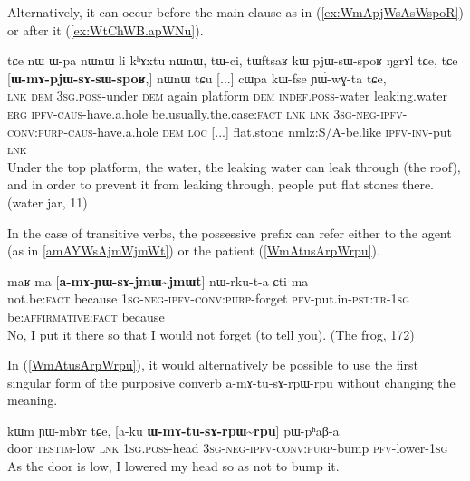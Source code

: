 \documentclass[oldfontcommands,oneside,a4paper,11pt]{article}
\newcommand{\ipa}[1]{{\phon \mbox{#1}}} %
\newcommand{\refb}[1]{(\ref{#1})}
\begin{document}
Alternatively, it can occur   before the main clause as in \refb{ex:WmApjWsAsWspoR} or after it \refb{ex:WtChWB.apWNu}.

\begin{exe}
\ex \label{ex:WmApjWsAsWspoR}
\gll
\ipa{tɕe}   	\ipa{nɯ}   	\ipa{ɯ-pa}   	\ipa{nɯnɯ}   	\ipa{li}   	\ipa{kʰɤxtu}   	\ipa{nɯnɯ,}   	\ipa{tɯ-ci,}   	\ipa{tɯftsaʁ}   	\ipa{kɯ}   	\ipa{pjɯ-sɯ-spoʁ}   	\ipa{ŋgrɤl}   	\ipa{tɕe,}    \ipa{tɕe}   	[\ipa{\textbf{ɯ-mɤ-pjɯ-sɤ-sɯ-spoʁ},}]   	\ipa{nɯnɯ}   	\ipa{tɕu}   [...] \ipa{cɯpa}   	\ipa{kɯ-fse}   	\ipa{ɲɯ́-wɣ-ta}   	\ipa{tɕe,}   \\
\textsc{lnk} \textsc{dem} \textsc{3sg.poss}-under \textsc{dem} again platform \textsc{dem} \textsc{indef.poss}-water leaking.water \textsc{erg} \textsc{ipfv}-\textsc{caus}-have.a.hole be.usually.the.case:\textsc{fact} \textsc{lnk} \textsc{lnk} \textsc{3sg-neg-ipfv-conv:purp}-\textsc{caus}-have.a.hole \textsc{dem} \textsc{loc} [...] flat.stone nm\textsc{}lz:S/A-be.like \textsc{ipfv-inv}-put \textsc{lnk} \\
\glt Under the top platform, the water, the leaking water can leak through (the roof), and in order to prevent it from leaking through, people put flat stones there. (water jar, 11)
\end{exe}

In the case of transitive verbs, the possessive prefix can refer either to the agent (as in \ref{amAYWsAjmWjmWt}) or the patient \refb{WmAtusArpWrpu}.

\begin{exe}
\ex \label{amAYWsAjmWjmWt}
\gll 
\ipa{maʁ}   	\ipa{ma}   	[\ipa{\textbf{a-mɤ-ɲɯ-sɤ-jmɯ\textasciitilde{}jmɯt}}]   	\ipa{nɯ-rku-t-a}   	\ipa{ɕti}   	\ipa{ma}   \\
not.be:\textsc{fact} because \textsc{1sg-neg-ipfv-conv:purp}-forget \textsc{pfv}-put.in-\textsc{pst:tr-1sg} be:\textsc{affirmative}:\textsc{fact} because \\
\glt No, I put it there so that I would not forget (to tell you). (The frog, 172)
\end{exe}

In \refb{WmAtusArpWrpu}, it would alternatively be possible to use the first singular form of the purposive converb \ipa{a-mɤ-tu-sɤ-rpɯ-rpu}   without changing the meaning.

 \begin{exe}
\ex \label{WmAtusArpWrpu}
\gll 
\ipa{kɯm}    	\ipa{ɲɯ-mbɤr}    	\ipa{tɕe,}    	[\ipa{a-ku}    	\textbf{\ipa{ɯ-mɤ-tu-sɤ-rpɯ\textasciitilde{}rpu}}]    	\ipa{pɯ-pʰaβ-a}    \\
door \textsc{testim}-low \textsc{lnk} \textsc{1sg.poss}-head \textsc{3sg-neg-ipfv-conv:purp}-bump \textsc{pfv}-lower-\textsc{1sg}\\
\glt As the door is low, I lowered my head so as not to bump it.
\end{exe}
\end{document}
